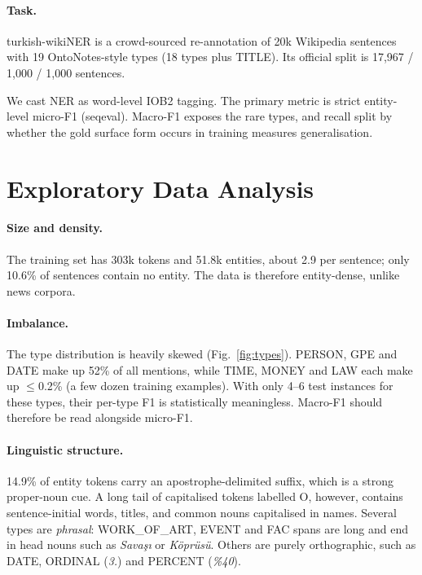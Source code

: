 \documentclass[11pt]{article}
\begin{document}
\paragraph{Task.}
turkish-wikiNER \citep{altinok2023turkish} is a crowd-sourced re-annotation of 20k Wikipedia sentences with 19 OntoNotes-style types (18 types plus TITLE). Its official split is 17{,}967 / 1{,}000 / 1{,}000 sentences.

We cast NER as word-level IOB2 tagging. The primary metric is strict entity-level micro-F1 (seqeval). Macro-F1 exposes the rare types, and recall split by whether the gold surface form occurs in training measures generalisation.

\section{Exploratory Data Analysis}
\paragraph{Size and density.} The training set has 303k tokens and 51.8k entities, about 2.9 per sentence; only 10.6\% of sentences contain no entity. The data is therefore entity-dense, unlike news corpora.

\paragraph{Imbalance.} The type distribution is heavily skewed (Fig.~\ref{fig:types}). PERSON, GPE and DATE make up 52\% of all mentions, while TIME, MONEY and LAW each make up $\le$0.2\% (a few dozen training examples). With only 4--6 test instances for these types, their per-type F1 is statistically meaningless. Macro-F1 should therefore be read alongside micro-F1.

\paragraph{Linguistic structure.} 14.9\% of entity tokens carry an apostrophe-delimited suffix, which is a strong proper-noun cue. A long tail of capitalised tokens labelled O, however, contains sentence-initial words, titles, and common nouns capitalised in names. Several types are \emph{phrasal}: WORK\_OF\_ART, EVENT and FAC spans are long and end in head nouns such as \textit{Savaşı} or \textit{Köprüsü}. Others are purely orthographic, such as DATE, ORDINAL (\textit{3.}) and PERCENT (\textit{\%40}).
\end{document}
